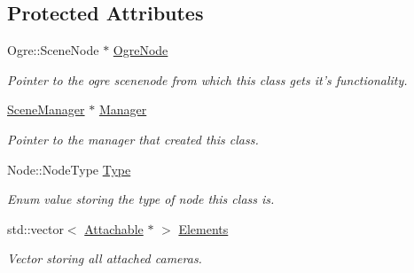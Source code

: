 \subsection*{Protected Attributes}
\begin{DoxyCompactItemize}
\item 
\hypertarget{classphys_1_1Node_ad3206b5ec36cb374e01cb8e822616c45}{
Ogre::SceneNode $\ast$ \hyperlink{classphys_1_1Node_ad3206b5ec36cb374e01cb8e822616c45}{OgreNode}}
\label{d0/ddc/classphys_1_1Node_ad3206b5ec36cb374e01cb8e822616c45}

\begin{DoxyCompactList}\small\item\em Pointer to the ogre scenenode from which this class gets it's functionality. \item\end{DoxyCompactList}\item 
\hypertarget{classphys_1_1Node_a7bb7fd7fc172f155d205512ef65f62a8}{
\hyperlink{classphys_1_1SceneManager}{SceneManager} $\ast$ \hyperlink{classphys_1_1Node_a7bb7fd7fc172f155d205512ef65f62a8}{Manager}}
\label{d0/ddc/classphys_1_1Node_a7bb7fd7fc172f155d205512ef65f62a8}

\begin{DoxyCompactList}\small\item\em Pointer to the manager that created this class. \item\end{DoxyCompactList}\item 
\hypertarget{classphys_1_1Node_a25ef0ab80e0dc257ecc3d3ce38f3236d}{
Node::NodeType \hyperlink{classphys_1_1Node_a25ef0ab80e0dc257ecc3d3ce38f3236d}{Type}}
\label{d0/ddc/classphys_1_1Node_a25ef0ab80e0dc257ecc3d3ce38f3236d}

\begin{DoxyCompactList}\small\item\em Enum value storing the type of node this class is. \item\end{DoxyCompactList}\item 
\hypertarget{classphys_1_1Node_a98c80724ecec3696aaa4c50574b522b4}{
std::vector$<$ \hyperlink{classphys_1_1Attachable}{Attachable} $\ast$ $>$ \hyperlink{classphys_1_1Node_a98c80724ecec3696aaa4c50574b522b4}{Elements}}
\label{d0/ddc/classphys_1_1Node_a98c80724ecec3696aaa4c50574b522b4}

\begin{DoxyCompactList}\small\item\em Vector storing all attached cameras. \item\end{DoxyCompactList}\end{DoxyCompactItemize}


